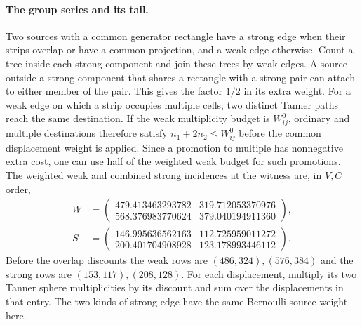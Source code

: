 \documentclass[10pt,twocolumn]{article}
\theoremstyle{definition}
\begin{document}
\paragraph{The group series and its tail.}
Two sources with a common generator rectangle have a strong edge
when their strips overlap or have a common projection, and a weak
edge otherwise. Count a tree inside each strong component and join
these trees by weak edges. A source outside a strong component
that shares a rectangle with a strong pair can attach to either
member of the pair. This gives the factor $1/2$ in its extra weight.
For a weak edge on which a strip occupies multiple cells, two
distinct Tanner paths reach the same destination. If the weak
multiplicity budget is $W^0_{ij}$, ordinary and multiple destinations
therefore satisfy $n_1+2n_2\le W^0_{ij}$ before the common
displacement weight is applied. Since a promotion to multiple has
nonnegative extra cost, one can use half of the weighted weak
budget for such promotions. The weighted weak and combined strong
incidences at the witness are, in $V,C$ order,
\[
\begin{aligned}
 W&=\begin{pmatrix}
479.413463293782&319.712053370976\\
568.376983770624&379.040194911360
\end{pmatrix},\\
 S&=\begin{pmatrix}
146.995636562163&112.725959011272\\
200.401704908928&123.178993446112
\end{pmatrix}.
\end{aligned}
\]
Before the overlap discounts the weak rows are $(486,324),(576,384)$
and the strong rows are $(153,117),(208,128)$. For each displacement,
multiply its two Tanner sphere multiplicities by its discount and
sum over the displacements in that entry. The two kinds of strong
edge have the same Bernoulli source weight here.
\end{document}
